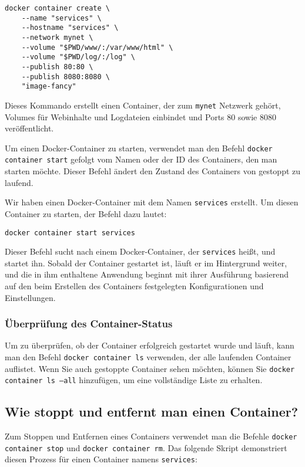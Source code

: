 \begin{verbatim}
docker container create \
    --name "services" \
    --hostname "services" \
    --network mynet \
    --volume "$PWD/www/:/var/www/html" \
    --volume "$PWD/log/:/log" \
    --publish 80:80 \
    --publish 8080:8080 \
    "image-fancy"
\end{verbatim}


Dieses Kommando erstellt einen Container, der zum \texttt{mynet} Netzwerk gehört, Volumes für Webinhalte und Logdateien einbindet und Ports 80 sowie 8080 veröffentlicht.

Um einen Docker-Container zu starten, verwendet man den Befehl \texttt{docker container start} gefolgt vom Namen oder der ID des Containers, den man starten möchte. Dieser Befehl ändert den Zustand des Containers von gestoppt zu laufend.

Wir haben einen Docker-Container mit dem Namen \texttt{services} erstellt. Um diesen Container zu starten, der Befehl dazu lautet:

\begin{verbatim}
docker container start services
\end{verbatim}

Dieser Befehl sucht nach einem Docker-Container, der \texttt{services} heißt, und startet ihn. Sobald der Container gestartet ist, läuft er im Hintergrund weiter, und die in ihm enthaltene Anwendung beginnt mit ihrer Ausführung basierend auf den beim Erstellen des Containers festgelegten Konfigurationen und Einstellungen.

\subsubsection{Überprüfung des Container-Status}

Um zu überprüfen, ob der Container erfolgreich gestartet wurde und läuft, kann man den Befehl \texttt{docker container ls} verwenden, der alle laufenden Container auflistet. Wenn Sie auch gestoppte Container sehen möchten, können Sie \texttt{docker container ls --all} hinzufügen, um eine vollständige Liste zu erhalten.

\subsection{Wie stoppt und entfernt man einen Container?}

Zum Stoppen und Entfernen eines Containers verwendet man die Befehle \texttt{docker container stop} und \texttt{docker container rm}. Das folgende Skript demonstriert diesen Prozess für einen Container namens \texttt{services}:

